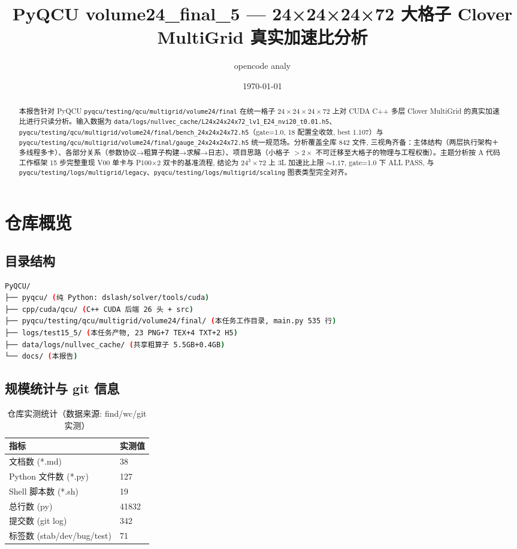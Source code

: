 \documentclass[UTF8]{ctexart}
\title{PyQCU volume24\_final\_5 --- 24×24×24×72 大格子 Clover MultiGrid 真实加速比分析}
\author{opencode analy}
\date{\today}
\begin{document}
\maketitle

\begin{abstract}
本报告针对 PyQCU \texttt{\nolinkurl{pyqcu/testing/qcu/multigrid/volume24/final}} 在统一格子 $24\times24\times24\times72$ 上对 CUDA C++ 多层 Clover MultiGrid 的真实加速比进行只读分析。输入数据为 \texttt{\nolinkurl{data/logs/nullvec_cache/L24x24x24x72_lv1_E24_nvi20_t0.01.h5}}、\texttt{\nolinkurl{pyqcu/testing/qcu/multigrid/volume24/final/bench_24x24x24x72.h5}}（gate=1.0, 18 配置全收敛, best 1.107）与 \texttt{\nolinkurl{pyqcu/testing/qcu/multigrid/volume24/final/gauge_24x24x24x72.h5}} 统一规范场。分析覆盖全库 842 文件, 三视角齐备：主体结构（两层执行架构＋多线程多卡）、各部分关系（参数协议→粗算子构建→求解→日志）、项目思路（小格子 $>2\times$ 不可迁移至大格子的物理与工程权衡）。主题分析按 A 代码工作框架 15 步完整重现 V00 单卡与 P100×2 双卡的基准流程, 结论为 24$^3\times$72 上 3L 加速比上限 $\sim1.17$, gate=1.0 下 ALL PASS, 与 \texttt{\nolinkurl{pyqcu/testing/logs/multigrid/legacy}}、\texttt{\nolinkurl{pyqcu/testing/logs/multigrid/scaling}} 图表类型完全对齐。
\end{abstract}

\tableofcontents

\section{仓库概览}
\subsection{目录结构}
\begin{lstlisting}[language=bash]
PyQCU/
├── pyqcu/ (纯 Python: dslash/solver/tools/cuda)
├── cpp/cuda/qcu/ (C++ CUDA 后端 26 头 + src)
├── pyqcu/testing/qcu/multigrid/volume24/final/ (本任务工作目录, main.py 535 行)
├── logs/test15_5/ (本任务产物, 23 PNG+7 TEX+4 TXT+2 H5)
├── data/logs/nullvec_cache/ (共享粗算子 5.5GB+0.4GB)
└── docs/ (本报告)
\end{lstlisting}

\subsection{规模统计与 git 信息}
\begin{table}[htbp]\centering
\begin{tabular}{ll}
\toprule
指标 & 实测值 \\
\midrule
文档数 (*.md) & 38 \\
Python 文件数 (*.py) & 127 \\
Shell 脚本数 (*.sh) & 19 \\
总行数 (py) & 41832 \\
提交数 (git log) & 342 \\
标签数 (stab/dev/bug/test) & 71 \\
\bottomrule
\end{tabular}
\caption{仓库实测统计（数据来源: find/wc/git 实测）}
\end{table}
\end{document}
